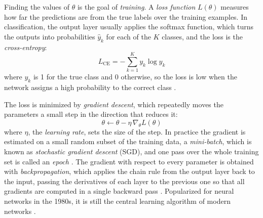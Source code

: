 Finding the values of $\theta$ is the goal of \emph{training}. A \emph{loss function} $L(\theta)$ measures how far the predictions are from the true labels over the training examples. In classification, the output layer usually applies the softmax function, which turns the outputs into probabilities $\hat{y}_k$ for each of the $K$ classes, and the loss is the \emph{cross-entropy}:
\begin{equation}
  L_{\mathrm{CE}} = - \sum_{k=1}^{K} y_k \log \hat{y}_k
  \label{eq:cross_entropy}
\end{equation}
where $y_k$ is 1 for the true class and 0 otherwise, so the loss is low when the network assigns a high probability to the correct class \parencite{yamashita2018convolutional}.

The loss is minimized by \emph{gradient descent}, which repeatedly moves the parameters a small step in the direction that reduces it:
\begin{equation}
  \theta \leftarrow \theta - \eta\, \nabla_{\theta} L(\theta)
  \label{eq:gradient_descent}
\end{equation}
where $\eta$, the \emph{learning rate}, sets the size of the step. In practice the gradient is estimated on a small random subset of the training data, a \emph{mini-batch}, which is known as \emph{stochastic gradient descent} (SGD), and one pass over the whole training set is called an \emph{epoch} \parencite{yamashita2018convolutional,alzubaidi2021review}. The gradient with respect to every parameter is obtained with \emph{backpropagation}, which applies the chain rule from the output layer back to the input, passing the derivatives of each layer to the previous one so that all gradients are computed in a single backward pass \parencite{schmidhuber2015deep}. Popularized for neural networks in the 1980s, it is still the central learning algorithm of modern networks \parencite{schmidhuber2015deep}.

